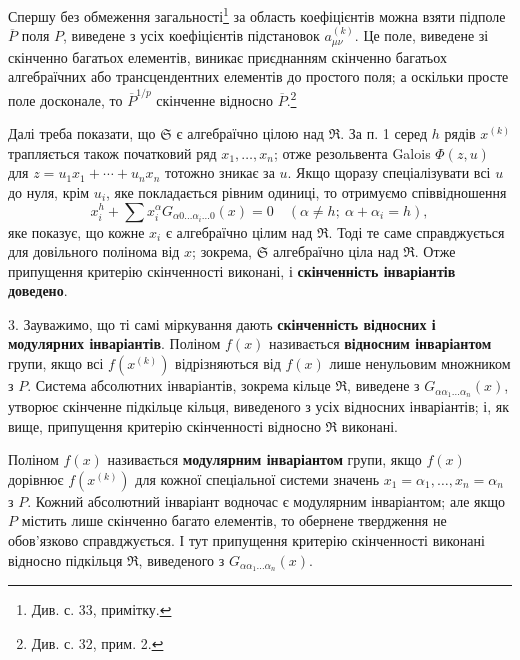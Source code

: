 \documentclass[11pt]{article}
\begin{document}
Спершу без обмеження загальності\footnote{Див. с. 33, примітку.} за область коефіцієнтів можна взяти підполе $\overline P$ поля $P$, виведене з усіх коефіцієнтів підстановок $a_{\mu\nu}^{(k)}$. Це поле, виведене зі скінченно багатьох елементів, виникає приєднанням скінченно багатьох алгебраїчних або трансцендентних елементів до простого поля; а оскільки просте поле досконале, то $\overline P^{1/p}$ скінченне відносно $\overline P$.\footnote{Див. с. 32, прим. 2.}

Далі треба показати, що $\mathfrak S$ є алгебраїчно цілою над $\mathfrak R$. За п. 1 серед $h$ рядів $x^{(k)}$ трапляється також початковий ряд $x_1,\ldots,x_n$; отже резольвента Galois $\Phi(z,u)$ для $z=u_1x_1+\cdots+u_nx_n$ тотожно зникає за $u$. Якщо щоразу спеціалізувати всі $u$ до нуля, крім $u_i$, яке покладається рівним одиниці, то отримуємо співвідношення
\[
 x_i^h+\sum x_i^\alpha G_{\alpha0\ldots\alpha_i\ldots0}(x)=0
 \quad (\alpha\ne h;\ \alpha+\alpha_i=h),
\]
яке показує, що кожне $x_i$ є алгебраїчно цілим над $\mathfrak R$. Тоді те саме справджується для довільного полінома від $x$; зокрема, $\mathfrak S$ алгебраїчно ціла над $\mathfrak R$. Отже припущення критерію скінченності виконані, і \textbf{скінченність інваріантів доведено}.

3. Зауважимо, що ті самі міркування дають \textbf{скінченність відносних і модулярних інваріантів}. Поліном $f(x)$ називається \textbf{відносним інваріантом} групи, якщо всі $f(x^{(k)})$ відрізняються від $f(x)$ лише ненульовим множником з $P$. Система абсолютних інваріантів, зокрема кільце $\mathfrak R$, виведене з $G_{\alpha\alpha_1\ldots\alpha_n}(x)$, утворює скінченне підкільце кільця, виведеного з усіх відносних інваріантів; і, як вище, припущення критерію скінченності відносно $\mathfrak R$ виконані.

Поліном $f(x)$ називається \textbf{модулярним інваріантом} групи, якщо $f(x)$ дорівнює $f(x^{(k)})$ для кожної спеціальної системи значень $x_1=\alpha_1,\ldots,x_n=\alpha_n$ з $P$. Кожний абсолютний інваріант водночас є модулярним інваріантом; але якщо $P$ містить лише скінченно багато елементів, то обернене твердження не обов'язково справджується. І тут припущення критерію скінченності виконані відносно підкільця $\mathfrak R$, виведеного з $G_{\alpha\alpha_1\ldots\alpha_n}(x)$.

\clearpage
\end{document}
